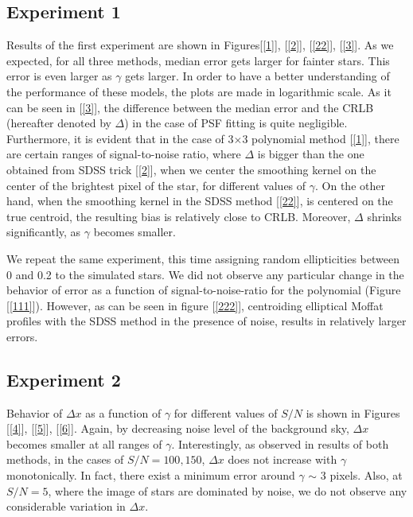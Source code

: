 \documentclass[12pt, preprint]{aastex}
\begin{document}
\subsection{Experiment 1}
   
Results of the first experiment are shown in Figures[\ref{1}], [\ref{2}], [\ref{22}], [\ref{3}]. As we expected, for all three methods, median error gets larger for fainter stars. This error is even larger as $\gamma$ gets larger. In order to have a better understanding of the performance of these models, the plots are made in logarithmic scale. As it can be seen in [\ref{3}], the difference between the median error and the CRLB (hereafter denoted by $\Delta$) in the case of PSF fitting is quite negligible. Furthermore, it is evident that in the case of 3$\times$3 polynomial method [\ref{1}], there are certain ranges of signal-to-noise ratio, where $\Delta$ is bigger than the one obtained from SDSS trick [\ref{2}], when we center the smoothing kernel on the center of the brightest pixel of the star, for different values of $\gamma$. On the other hand, when the smoothing kernel in the SDSS method [\ref{22}], is centered on the true centroid, the resulting bias is relatively close to CRLB. Moreover, $\Delta$ shrinks significantly, as $\gamma$ becomes smaller. 

We repeat the same experiment, this time assigning random ellipticities between 0 and 0.2 to the simulated stars. We did not observe any particular change in the behavior of error as a function of signal-to-noise-ratio for the polynomial (Figure [\ref{111}]). However, as can be seen in figure [\ref{222}], centroiding elliptical Moffat profiles with the SDSS method in the presence of noise, results in relatively larger errors.     

\subsection{Experiment 2}

Behavior of $\Delta x$ as a function of $\gamma$ for different values of $S/N$ is shown in Figures [\ref{4}], [\ref{5}], [\ref{6}]. Again, by decreasing noise level of the background sky, $\Delta x$ becomes smaller at all ranges of $\gamma$. Interestingly, as observed in results of both methods, in the cases of $S/N = 100, 150$, $\Delta x$ does not increase with $\gamma$ monotonically. In fact, there exist a minimum error around $\gamma$ $\sim$ 3 pixels. Also, at $S/N = 5$, where the image of stars are dominated by noise, we do not observe any considerable variation in $\Delta x$. 
\end{document}
